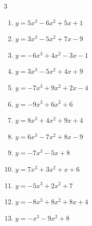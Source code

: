 \begin{multicols}{3}
\begin{enumerate}
  \item $y=5x^{3}-6x^{2}+5x+1$


  \item $y=3x^{3}-5x^{2}+7x-9$


  \item $y=-6x^{3}+4x^{2}-3x-1$


  \item $y=3x^{3}-5x^{2}+4x+9$


  \item $y=-7x^{3}+9x^{2}+2x-4$


  \item $y=-9x^{3}+6x^{2}+6$


  \item $y=8x^{3}+4x^{2}+9x+4$


  \item $y=6x^{3}-7x^{2}+8x-9$


  \item $y=-7x^{3}-5x+8$


  \item $y=7x^{3}+3x^{2}+x+6$


  \item $y=-5x^{3}+2x^{2}+7$


  \item $y=-8x^{3}+8x^{2}+8x+4$


  \item $y=-x^{3}-9x^{2}+8$


\end{enumerate}
\end{multicols}
